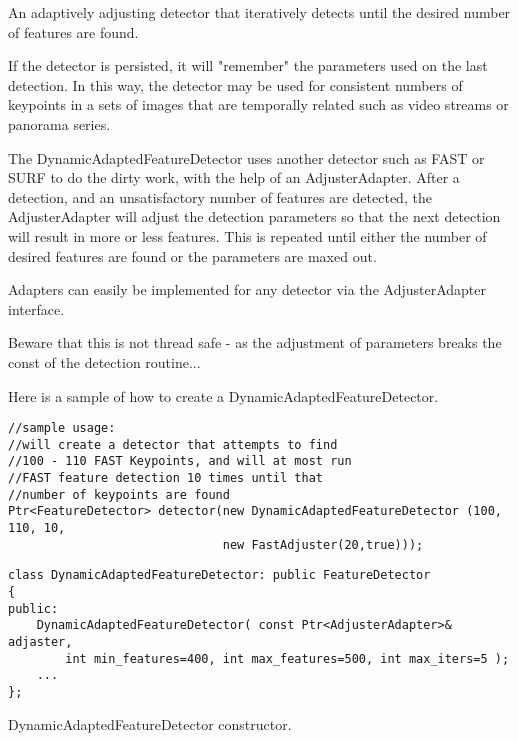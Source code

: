 An adaptively adjusting detector that iteratively detects until the desired number
of features are found.  

If the detector is persisted, it will "remember" the parameters
used on the last detection. In this way, the detector may be used for consistent numbers
of keypoints in a sets of images that are temporally related such as video streams or
panorama series.

The DynamicAdaptedFeatureDetector uses another detector such as FAST or SURF to do the dirty work,
with the help of an AdjusterAdapter.
After a detection, and an unsatisfactory number of features are detected,
the AdjusterAdapter will adjust the detection parameters so that the next detection will
result in more or less features.  This is repeated until either the number of desired features are found
or the parameters are maxed out.

Adapters can easily be implemented for any detector via the  
AdjusterAdapter interface.

Beware that this is not thread safe - as the adjustment of parameters breaks the const
of the detection routine...

Here is a sample of how to create a DynamicAdaptedFeatureDetector.
\begin{lstlisting}
//sample usage:
//will create a detector that attempts to find 
//100 - 110 FAST Keypoints, and will at most run
//FAST feature detection 10 times until that 
//number of keypoints are found
Ptr<FeatureDetector> detector(new DynamicAdaptedFeatureDetector (100, 110, 10,
                              new FastAdjuster(20,true)));
\end{lstlisting}
 
\begin{lstlisting}
class DynamicAdaptedFeatureDetector: public FeatureDetector 
{
public:
    DynamicAdaptedFeatureDetector( const Ptr<AdjusterAdapter>& adjaster, 
        int min_features=400, int max_features=500, int max_iters=5 );
    ...
};
\end{lstlisting}

DynamicAdaptedFeatureDetector constructor.

